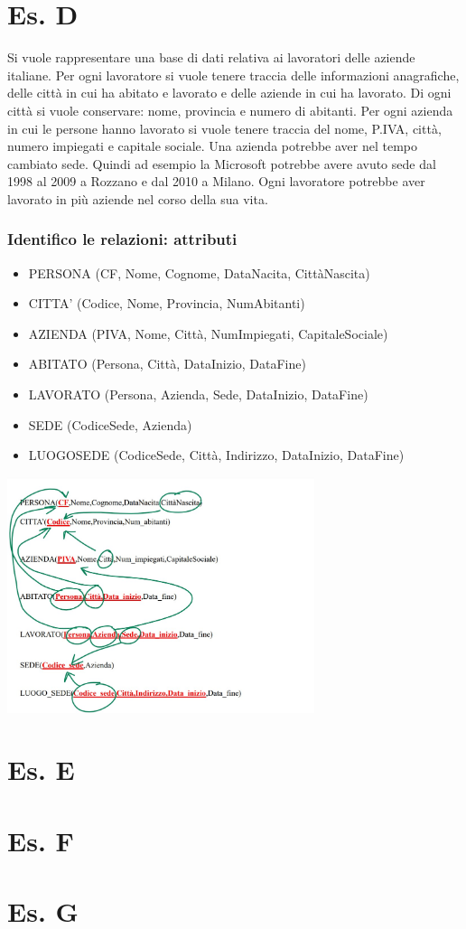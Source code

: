 \section{Es. D}
Si vuole rappresentare una base di dati relativa ai lavoratori delle aziende italiane. Per ogni lavoratore si vuole tenere traccia delle informazioni anagrafiche, delle città in cui ha abitato e lavorato e delle aziende in cui ha lavorato. Di ogni città si vuole conservare: nome, provincia e numero di abitanti. Per ogni azienda in cui le persone hanno lavorato si vuole tenere traccia del nome, P.IVA, città, numero impiegati e capitale sociale. Una azienda potrebbe aver nel tempo cambiato sede. Quindi ad esempio la Microsoft potrebbe avere avuto sede dal 1998 al 2009 a Rozzano e dal 2010 a Milano. Ogni lavoratore potrebbe aver lavorato in più aziende nel corso della sua vita.

\subsubsection{Identifico le relazioni: attributi}
\begin{itemize}
    \item PERSONA (CF, Nome, Cognome, DataNacita, CittàNascita)
    \item CITTA' (Codice, Nome, Provincia, NumAbitanti)
    \item AZIENDA (PIVA, Nome, Città, NumImpiegati, CapitaleSociale)
    \item ABITATO (Persona, Città, DataInizio, DataFine)
    \item LAVORATO (Persona, Azienda, Sede, DataInizio, DataFine)
    \item SEDE (CodiceSede, Azienda)
    \item LUOGOSEDE (CodiceSede, Città, Indirizzo, DataInizio, DataFine)
\end{itemize}
\begin{center}
    \includegraphics[width=0.675\textwidth]{chaptersLezioniSara/img/MR_fileesD.jpg}
\end{center}

\section{Es. E}
\section{Es. F}
\section{Es. G}